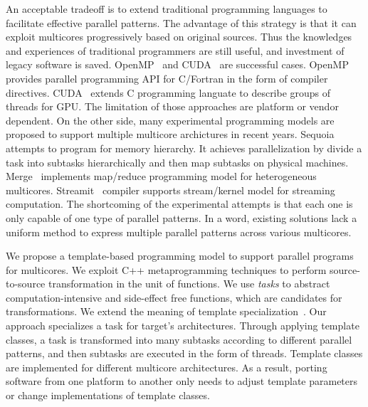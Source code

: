 An acceptable tradeoff is to extend traditional programming
languages to facilitate effective parallel patterns. The advantage of
this strategy is that it can exploit multicores progressively based on
original sources. Thus the
knowledges and
experiences of traditional programmers are still useful, and investment
of legacy software is saved. OpenMP~\cite{openmp}  and
CUDA~\cite{cuda} are successful cases. OpenMP provides parallel
programming API for C/Fortran in the form of compiler directives. CUDA~\cite{cuda} extends C programming languate to describe
groups of threads for GPU. The limitation of those approaches are
platform or vendor dependent. On the other side, many experimental
programming models are proposed to support multiple multicore
archictures in recent years.
Sequoia~\cite{sequoia} attempts to program for memory hierarchy. It
achieves parallelization by divide a task into subtasks hierarchically and then map
subtasks on physical machines. Merge~\cite{merge} implements
map/reduce programming model for heterogeneous
multicores. Streamit~\cite{ThiesKA02} compiler supports stream/kernel
model for streaming computation. The shortcoming of the experimental
attempts is that each one
is only capable of one type of parallel patterns.  In a word, existing solutions
lack a uniform method to express multiple parallel patterns
across various multicores.

We propose a template-based programming model to
support parallel programs for multicores. We exploit C++
metaprogramming techniques to perform source-to-source transformation
in the unit of functions. We use \emph{tasks} to abstract
computation-intensive and side-effect free functions, which are candidates for transformations. We extend the meaning of template
specialization~\cite{tcpl}. Our approach specializes a task for target's
architectures.  Through applying template classes, a task is
transformed into many subtasks according to different parallel
patterns, and then subtasks are executed in the form of threads.
Template classes are implemented for different multicore
architectures. As a result, porting software from one platform to another only
needs to adjust template parameters or change implementations of
template classes. 

